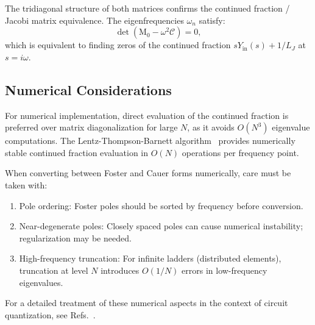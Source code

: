 \documentclass[reprint, floatfix, superscriptaddress, amsmath, amssymb, longbibliography]{revtex4-2}
\begin{document}
The tridiagonal structure of both matrices confirms the continued fraction / Jacobi matrix equivalence. The eigenfrequencies $\omega_n$ satisfy:
\begin{equation}
\det(\mathrm{M}_0 - \omega^2 \mathcal{C}) = 0,
\label{eq:sd_eigenvalue}
\end{equation}
which is equivalent to finding zeros of the continued fraction $sY_{\mathrm{in}}(s) + 1/L_J$ at $s = i\omega$.

\subsection{Numerical Considerations}
\label{app:numerical}

For numerical implementation, direct evaluation of the continued fraction is preferred over matrix diagonalization for large $N$, as it avoids $O(N^3)$ eigenvalue computations. The Lentz-Thompson-Barnett algorithm~\cite{Press2007} provides numerically stable continued fraction evaluation in $O(N)$ operations per frequency point.

When converting between Foster and Cauer forms numerically, care must be taken with:
\begin{enumerate}
\item {Pole ordering:} Foster poles should be sorted by frequency before conversion.
\item {Near-degenerate poles:} Closely spaced poles can cause numerical instability; regularization may be needed.
\item {High-frequency truncation:} For infinite ladders (distributed elements), truncation at level $N$ introduces $O(1/N)$ errors in low-frequency eigenvalues.
\end{enumerate}

For a detailed treatment of these numerical aspects in the context of circuit quantization, see Refs.~\cite{Solgun2015, Minev2021}.
\end{document}
